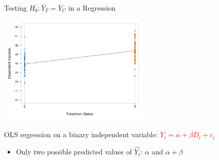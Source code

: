 \documentclass[10pt,xcolor=table,ignorenonframetext,handout,aspectratio=169]{beamer}
\newlength{\wideitemsep}
\let\olditem\item
\renewcommand{\item}{\setlength{\itemsep}{\wideitemsep}\olditem}
\begin{document}
\begin{frame}{Testing $H_0: \bar{Y}_T =\bar{Y}_C$ in a Regression}

\medskip
\begin{center}
	\includegraphics[width=0.54\textwidth]{fig/TvsCreg.pdf}
\end{center}

OLS regression on a binary independent variable: \textcolor{red}{$Y_i = \alpha + \beta D_i + \varepsilon_i$}

\medskip
\begin{itemize}
	
	\item Only two possible predicted values of $\hat{Y_i}$:  $\alpha$ and $\alpha + \beta$
	
\end{itemize}

\end{frame}


\end{document}
